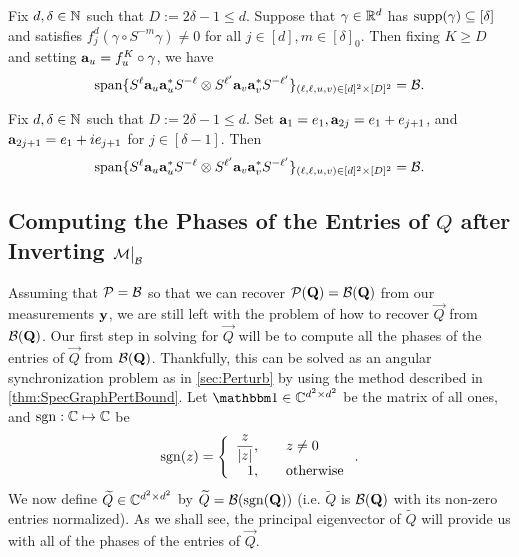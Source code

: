 \begin{corollary} \label{cor:2d_gam_span}
  Fix $d, \delta \in \mathbb{N}$ such that $D := 2 \delta - 1 \le d$.  Suppose that $\gamma \in \mathbb{R}^d$ has $\operatorname{supp}(\gamma) \subseteq [\delta]$ and satisfies $f_j^d(\gamma \circ S^{-m} \gamma) \neq 0$ for all $j \in [d], m \in [\delta]_0$.  Then fixing $K \ge D$ and setting $\mathbf a_u = f^K_u \circ \gamma$, we have \[\operatorname{span}\{S^\ell \mathbf a_u \mathbf a_u^* S^{-\ell} \otimes S^{\ell'} \mathbf a_v \mathbf a_v^* S^{-\ell'}\}_{(\ell, \ell, u, v) \in [d]^2 \times [D]^2} = \mathcal{B}.\]
\end{corollary}

\begin{corollary} \label{cor:2d_sparse}
  Fix $d, \delta \in \mathbb{N}$ such that $D := 2 \delta - 1 \le d$.  Set $\mathbf a_1 = e_1, \mathbf a_{2j} = e_1 + e_{j+1}$, and $\mathbf a_{2j + 1} = e_1 + i e_{j+1}$ for $j \in [\delta - 1]$.  Then \[\operatorname{span}\{S^\ell \mathbf a_u \mathbf a_u^* S^{-\ell} \otimes S^{\ell'} \mathbf a_v \mathbf a_v^* S^{-\ell'}\}_{(\ell, \ell, u, v) \in [d]^2 \times [D]^2} = \mathcal{B}.\]
\end{corollary}

\subsection{Computing the Phases of the Entries of $Q$ after Inverting $\mathcal{M} \big|_{\mathcal{B}}$}
\label{sec:Getphases}

Assuming that $\mathcal{P} = \mathcal{B}$ so that we can recover $\mathcal{P} ( \mathbf{Q} ) = \mathcal{B} ( \mathbf{Q} )$ from our measurements $\mathbf y$, we are still left with the problem of how to recover $\vec{Q}$ from $\mathcal{B} ( \mathbf{Q} )$.  Our first step in solving for $\vec{Q}$ will be to compute all the phases of the entries of $\vec{Q}$ from $\mathcal{B}(\mathbf{Q})$.  Thankfully, this can be solved as an angular synchronization problem as in \cref{sec:Perturb} by using the method described in \cref{thm:SpecGraphPertBound}.  Let $\one \in \C^{d^2 \times d^2}$ be the matrix of all ones, and $\operatorname{sgn}: \mathbb{C} \mapsto  \mathbb{C}$ be 
$$\sgn(z) = \left\{\begin{array}{r@{,\qquad}l} \dfrac{z}{|z|} & z \neq 0 \\ 1 & \text{otherwise} \end{array}\right..$$
We now define $\widetilde{Q} \in \mathbb{C}^{d^2 \times d^2}$ by $\widetilde{Q} = \mathcal{B}(\operatorname{sgn}(\mathbf{Q}))$ (i.e. $\widetilde{Q}$ is $\mathcal{B}(\mathbf{Q})$ with its non-zero
entries normalized).  As we shall see, the principal eigenvector of $\widetilde{Q}$ will provide us with all of the phases of the entries of $\vec{Q}$.

